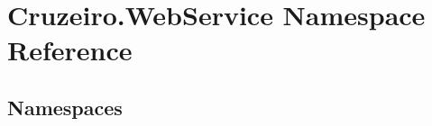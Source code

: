 \hypertarget{namespace_cruzeiro_1_1_web_service}{}\section{Cruzeiro.\+Web\+Service Namespace Reference}
\label{namespace_cruzeiro_1_1_web_service}
\subsection*{Namespaces}
\begin{DoxyCompactItemize}
\end{DoxyCompactItemize}
